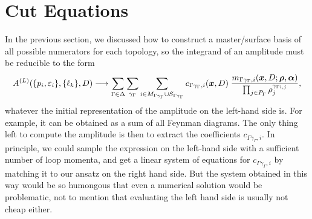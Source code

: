 \section{Cut Equations}
\label{sec:cut_equations}
{

In the previous section, we discussed how to construct a master/surface basis
of all possible numerators for each topology, so the integrand of an amplitude must 
be reducible to the form
\begin{equation} \label{eq:unitarity_ansatz}
  A^{(L)}(\{p_i,\varepsilon_i\}, \{\ell_k\}, D) \longrightarrow  
  \sum_{\Gamma \in \Delta} \sum_{\gamma_\Gamma} \sum_{i \in M_{\Gamma\gamma_\Gamma} \cup S_{\Gamma\gamma_\Gamma}} c_{\Gamma\gamma_\Gamma, i}(\vb*{x},D) \;
  \frac{m_{\Gamma\gamma_\Gamma, i} (\vb*{x},D;\vb*{\rho},\vb*{\alpha}) }%
    {\prod_{j\in P_\Gamma} \rho_j^{\gamma_{\Gamma i, j}}},
\end{equation}
whatever the initial representation of the amplitude on the left-hand side is.
For example, it can be obtained as a sum of all Feynman diagrams.
The only thing left to compute the amplitude is then
to extract the coefficients $c_{\Gamma\gamma_\Gamma, i}$.
In principle, we could sample the expression on the left-hand side with a sufficient number of loop momenta,
and get a linear system of equations for $c_{\Gamma\gamma_\Gamma, i}$ by matching it to our ansatz on the right hand side.
But the system obtained in this way would be so humongous that even a numerical solution would be problematic,
not to mention that evaluating the left hand side is usually not cheap either.

}
